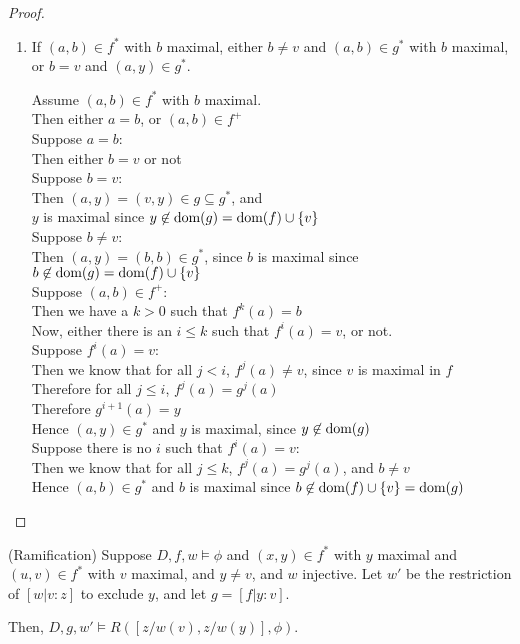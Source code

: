 \begin{proof}
\begin{enumerate}
\item If $(a,b) \in f^*$ with $b$ maximal, either $b \not= v$ and $(a,b) \in g^*$ with $b$ maximal,
  or $b = v$ and $(a,y) \in g^*$. 
\begin{tabbedproof}
\oo Assume $(a,b) \in f^*$ with $b$ maximal. \\
\ooo Then either $a = b$, or $(a,b) \in f^+$ \\
\ooo Suppose $a = b$: \\
\oooo Then either $b = v$ or not \\
\oooo Suppose $b = v$: \\
\ooooo Then $(a,y) = (v,y) \in g \subseteq g^*$, and  \\
\ooooo $y$ is maximal since $y \not\in \mbox{dom}({g}) = \mbox{dom}({f}) \cup \{{v}\}$ \\
\oooo Suppose $b \not= v$: \\
\ooooo Then $(a,y) = (b, b) \in g^*$, since $b$ is maximal since $b \not\in \mbox{dom}({g}) = \mbox{dom}({f}) \cup \{{v}\}$ \\ 
\ooo Suppose $(a,b) \in f^+$: \\
\oooo Then we have a $k > 0$ such that $f^k(a) = b$ \\
\oooo Now, either there is an $i \leq k$ such that $f^i(a) = v$, or not. \\
\oooo Suppose $f^i(a) = v$: \\
\ooooo Then we know that for all $j < i$, $f^j(a) \not= v$, since $v$ is maximal in $f$ \\
\ooooo Therefore for all $j \leq i$, $f^j(a) = g^j(a)$ \\
\ooooo Therefore $g^{i+1}(a) = y$ \\
\ooooo Hence $(a,y) \in g^*$ and $y$ is maximal, since $y \not\in \mbox{dom}({g})$ \\
\oooo Suppose there is no $i$ such that $f^i(a) = v$: \\
\ooooo Then we know that for all $j \leq k$, $f^j(a) = g^j(a)$, and $b \not= v$ \\
\ooooo Hence $(a,b) \in g^*$ and $b$ is maximal since $b \not\in \mbox{dom}({f}) \cup \{{v}\} = \mbox{dom}({g})$\\
\end{tabbedproof}
\end{enumerate}
\end{proof}

\begin{lemma}{(Ramification)}
Suppose $D, f, w \models \phi$ and $(x,y) \in f^*$ with $y$ maximal and $(u, v) \in f^*$ with $v$ maximal,
and $y \not= v$, and $w$ injective. Let $w'$ be the restriction of $[w|v:z]$ to exclude $y$, and let $g = [f|y:v]$. 

Then, $D, g,  w' \models R([z/w(v), z/w(y)], \phi)$.
\end{lemma}

